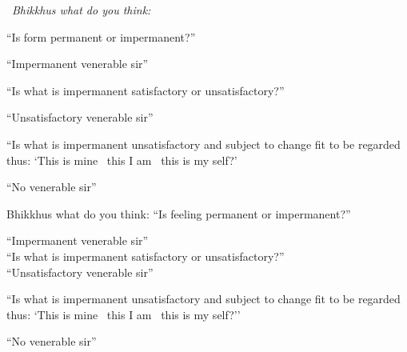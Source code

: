 \begin{english-only-leader}
  \anglebracketleft\ \hspace{-0.5mm}\textit{Bhikkhus what do you think:} \hspace{-0.5mm}\anglebracketright\
\end{english-only-leader}
\begin{english-only-hangtogether}
  ``Is form permanent or impermanent?''
\end{english-only-hangtogether}
\begin{english-only-hangtogether}
  ``Impermanent venerable sir''
\end{english-only-hangtogether}
\begin{english-only-hangtogether}
  ``Is what is impermanent satisfactory or unsatisfactory?''
\end{english-only-hangtogether}
\begin{english-only-hangtogether}
  ``Unsatisfactory venerable sir''
\end{english-only-hangtogether}
\begin{english-only-hangtogether}
  ``Is what is impermanent unsatisfactory and subject to change fit to be regarded thus: `This is mine \breathmark\ this I am \breathmark\ this is my self?'
\end{english-only-hangtogether}
\begin{english-only-hangtogether}
  ``No venerable sir''
\end{english-only-hangtogether}

\begin{english-only-nohang}
  \begin{english-only-hang}
    Bhikkhus what do you think: ``Is feeling permanent or impermanent?''
  \end{english-only-hang}
  ``Impermanent venerable sir''\\
  ``Is what is impermanent satisfactory or unsatisfactory?''\\
  ``Unsatisfactory venerable sir''\\
  \begin{english-hangtogether}
    ``Is what is impermanent unsatisfactory and subject to change fit to be regarded thus: `This is mine \breathmark\ this I am \breathmark\ this is my self?''
  \end{english-hangtogether}
  ``No venerable sir''
\end{english-only-nohang}

